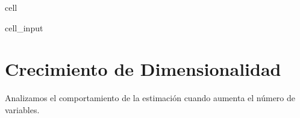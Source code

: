 \documentclass[letterpaper,10pt,english]{jupyterBook}
\begin{document}
\begin{sphinxuseclass}{cell}\begin{sphinxVerbatimInput}

\begin{sphinxuseclass}{cell_input}
\begin{sphinxVerbatim}[commandchars=\\\{\}]
  
    \PYG{p}{[}\PYG{p}{]}
    \PYG{p}{[}\PYG{p}{]}
    \PYG{p}{[}\PYG{p}{]}

 
\end{sphinxVerbatim}

\end{sphinxuseclass}\end{sphinxVerbatimInput}

\end{sphinxuseclass}

\section{Crecimiento de Dimensionalidad}
\label{\detokenize{03_multivariate_models/high_dimensional:crecimiento-de-dimensionalidad}}
\sphinxAtStartPar
Analizamos el comportamiento de la estimación
cuando aumenta el número de variables.
\end{document}
